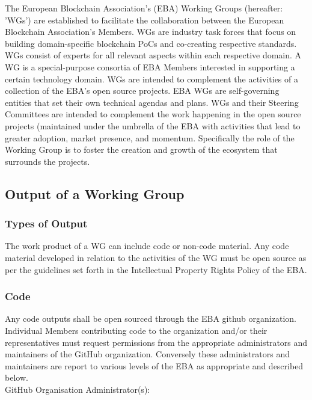 \documentclass{article}
\begin{document}
The European Blockchain Association’s (EBA) Working Groups (hereafter: 'WGs') are established to facilitate the collaboration between the European Blockchain Association’s Members. 
WGs are industry task forces that focus on building domain-specific blockchain PoCs and co-creating respective standards. 
WGs consist of experts for all relevant aspects within each respective domain. 
A WG is a special-purpose consortia of EBA Members interested in supporting a certain technology domain. 
WGs are intended to complement the activities of a collection of the EBA’s open source projects. 
EBA WGs are self-governing entities that set their own technical agendas and plans. 
WGs and their Steering Committees are intended to complement the work happening in the open source projects (maintained under the umbrella of the EBA  with activities that lead to greater adoption, market presence, and momentum. Specifically the role of the Working Group is to foster the creation and growth of the ecosystem that surrounds the projects.

\subsection{Output of a Working Group}

\subsubsection{Types of Output}

The work product of a WG can include code or non-code material. 
Any code material developed in relation to the activities of the WG must be open source as per the guidelines set forth in the Intellectual Property Rights Policy of the EBA.

\subsubsection{Code}

Any code outputs shall be open sourced through the EBA github organization. 
Individual Members contributing code to the organization and/or their representatives must request permissions from the appropriate administrators and maintainers of the GitHub organization. 
Conversely these administrators and maintainers are report to various levels of the EBA as appropriate and described below. \\

GitHub Organisation Administrator(s): \\
\end{document}

